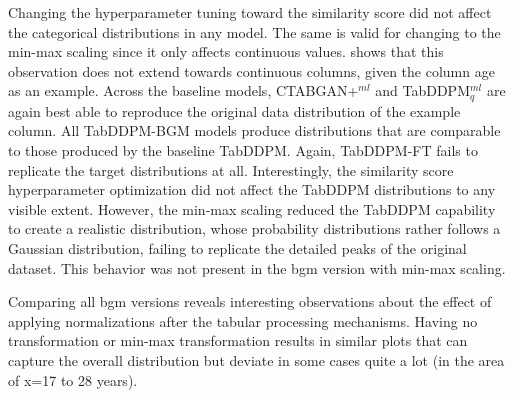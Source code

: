 Changing the hyperparameter tuning toward the similarity score did not affect the categorical distributions in any \gls{model}.
The same is valid for changing to the min-max scaling since it only affects continuous values.
 shows that this observation does not extend towards continuous columns, given the column age as an example.
Across the baseline models, CTABGAN+$^{ml}$ and TabDDPM$^{ml}_q$ are again best able to reproduce the original data distribution of the example column.
All TabDDPM-BGM models produce distributions that are comparable to those produced by the baseline TabDDPM.
Again, TabDDPM-FT fails to replicate the target distributions at all.
Interestingly, the similarity score hyperparameter optimization did not affect the TabDDPM distributions to any visible extent.
However, the min-max scaling reduced the TabDDPM capability to create a realistic distribution, whose probability distributions rather follows a Gaussian distribution, failing to replicate the detailed peaks of the original dataset.
This behavior was not present in the \gls{bgm} version with min-max scaling.

Comparing all \gls{bgm} versions reveals interesting observations about the effect of applying normalizations after the tabular processing mechanisms.
Having no transformation or min-max transformation results in similar plots that can capture the overall distribution but deviate in some cases quite a lot (in the area of x=17 to 28 years).\newpage

